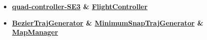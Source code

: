 \documentclass[11pt,a4paper,sans]{moderncv}        %
\begin{document}
\begin{itemize}


\item \textbf{\href{https://github.com/jianhengLiu/quad_controller_SE3}{quad-controller-SE3} \& \href{https://github.com/jianhengLiu/FlightController}{FlightController}} %




\item \textbf{\href{https://github.com/jianhengLiu/BezierTrajGenerator}{BezierTrajGenerator} \& \href{https://github.com/jianhengLiu/MinimumSnapTrajGenerator}{MinimumSnapTrajGenerator} \& 
\href{https://github.com/jianhengLiu/MapManager}{MapManager}} %



\end{itemize}


\nocite{*}

\end{document}
